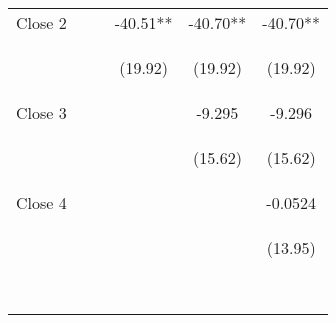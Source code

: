 \begin{table}[h!]
\begin{center}
{\begin{tabular}{lccccc}
Close 2 &  &  & -40.51** & -40.70** & -40.70** \\
\vspace{4pt} & \begin{footnotesize}\end{footnotesize} & \begin{footnotesize}\end{footnotesize} & \begin{footnotesize}(19.92)\end{footnotesize} & \begin{footnotesize}(19.92)\end{footnotesize} & \begin{footnotesize}(19.92)\end{footnotesize}  \\
Close 3 &  &  &  & -9.295 & -9.296 \\
\vspace{4pt} & \begin{footnotesize}\end{footnotesize} & \begin{footnotesize}\end{footnotesize} & \begin{footnotesize}\end{footnotesize} & \begin{footnotesize}(15.62)\end{footnotesize} & \begin{footnotesize}(15.62)\end{footnotesize} \\
Close 4 &  &  &  &  & -0.0524  \\
\vspace{4pt} & \begin{footnotesize}\end{footnotesize} & \begin{footnotesize}\end{footnotesize} & \begin{footnotesize}\end{footnotesize} & \begin{footnotesize}\end{footnotesize} & \begin{footnotesize}(13.95)\end{footnotesize}  \\
\vspace{4pt} & \begin{footnotesize}\end{footnotesize} & \begin{footnotesize}\end{footnotesize} & \begin{footnotesize}\end{footnotesize} & \begin{footnotesize}\end{footnotesize} & \begin{footnotesize}\end{footnotesize} \\\

\end{tabular}}
\end{center}
\end{table}
